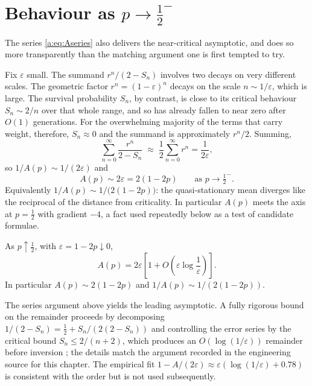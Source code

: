 \section{Behaviour as \texorpdfstring{$p\to\tfrac12^-$}{p to 1/2}}
\label{a:sec:asymptotic}

The series \cref{a:eq:Aseries} also delivers the near-critical asymptotic, and does
so more transparently than the matching argument one is first tempted to try.

Fix $\varepsilon$ small. The summand $r^n/(2-S_n)$ involves two decays on very
different scales. The geometric factor $r^n = (1-\varepsilon)^n$ decays on the
scale $n\sim1/\varepsilon$, which is large. The survival probability $S_n$, by
contrast, is close to its critical behaviour $S_n\sim2/n$ over that whole range,
and so has already fallen to near zero after $O(1)$ generations. For the
overwhelming majority of the terms that carry weight, therefore, $S_n\approx0$ and
the summand is approximately $r^n/2$. Summing,
\begin{equation*}
\sum_{n=0}^{\infty}\frac{r^n}{2-S_n}
\;\approx\;
\frac12\sum_{n=0}^{\infty}r^n = \frac{1}{2\varepsilon},
\end{equation*}
so $1/A(p)\sim1/(2\varepsilon)$ and
\begin{equation}
\label{a:eq:Aasym}
\boxed{\;A(p)\sim2\varepsilon = 2(1-2p)\qquad\text{as }p\to\tfrac12^-.\;}
\end{equation}
Equivalently $1/A(p)\sim1/\bigl(2(1-2p)\bigr)$: the quasi-stationary mean diverges
like the reciprocal of the distance from criticality. In particular $A(p)$ meets
the axis at $p=\tfrac12$ with gradient $-4$, a fact used repeatedly below as a test
of candidate formulae.

\begin{theorem}
\label{a:thm:A-near-critical}
As $p\uparrow\tfrac12$, with $\varepsilon=1-2p\downarrow0$,
\begin{equation}
\label{a:eq:A-near-critical}
A(p)=2\varepsilon
\left[1+O\!\left(\varepsilon\log\frac1\varepsilon\right)\right].
\end{equation}
In particular $A(p)\sim2(1-2p)$ and $1/A(p)\sim1/(2(1-2p))$.
\end{theorem}

\noindent
The series argument above yields the leading asymptotic. A fully rigorous bound on
the remainder proceeds by decomposing $1/(2-S_n)=\tfrac12+S_n/(2(2-S_n))$ and
controlling the error series by the critical bound $S_n\le2/(n+2)$, which produces
an $O(\log(1/\varepsilon))$ remainder before inversion
\cite{Athreya1972}; the details match the argument recorded in the engineering
source for this chapter. The empirical fit
$1-A/(2\varepsilon)\approx\varepsilon(\log(1/\varepsilon)+0.78)$ is consistent with
the order but is not used subsequently.




